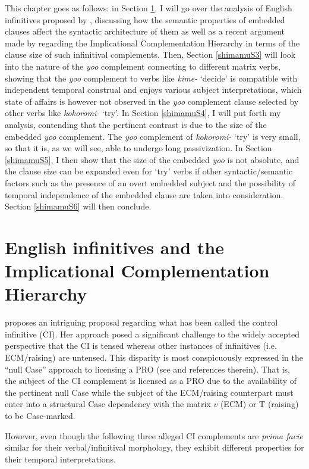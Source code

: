 \documentclass[output=paper]{langsci/langscibook}
\begin{document}
This chapter goes as follows: in Section \ref{shimamuS2}, I will go over the analysis of English infinitives proposed by \citet{Wurmbrand2014}, discussing how the semantic properties of embedded clauses affect the syntactic architecture of them as well as a recent argument made by \citet{wurmbrandlohninger2020} regarding the Implicational Complementation Hierarchy in terms of the clause size of such infinitival complements. Then, Section \ref{shimamuS3} will look into the nature of the \textit{yoo} complement connecting to different matrix verbs, showing that the \textit{yoo} complement to verbs like \textit{kime-} `decide' is compatible with independent temporal construal and enjoys various subject interpretations, which state of affairs is however not observed in the \textit{yoo} complement clause selected by other verbs like \textit{kokoromi-} `try'. In Section \ref{shimamuS4}, I will put forth my analysis, contending that the pertinent contrast is due to the size of the embedded \textit{yoo} complement. The \textit{yoo} complement of \textit{kokoromi-} `try' is very small, so that it is, as we will see, able to undergo long passivization. In Section \ref{shimamuS5}, I then show that the size of the embedded \textit{yoo} is not absolute, and the clause size can be expanded even for `try' verbs if other syntactic/semantic factors such as the presence of an overt embedded subject and the possibility of temporal independence of the embedded clause are taken into consideration. Section \ref{shimamuS6} will then conclude.
 
\section{English infinitives and the Implicational Complementation Hierarchy}\label{shimamuS2}
\citet{Wurmbrand2014} proposes an intriguing proposal regarding what has been called the control infinitive (CI). Her approach posed a significant challenge to the widely accepted perspective that the CI is tensed whereas other instances of infinitives (i.e. ECM/raising) are untensed. This disparity is most conspicuously expressed in the ``null Case'' approach to licensing a PRO (see \citealt{martin2001} and references therein). That is, the subject of the CI complement is licensed as a PRO due to the availability of the pertinent null Case while the subject of the ECM/raising counterpart must enter into a structural Case dependency with the matrix $v$ (ECM) or T (raising) to be Case-marked.

However, even though the following three alleged CI complements are \textit{prima facie} similar for their verbal/infinitival morphology, they exhibit different properties for their temporal interpretations.
\end{document}
